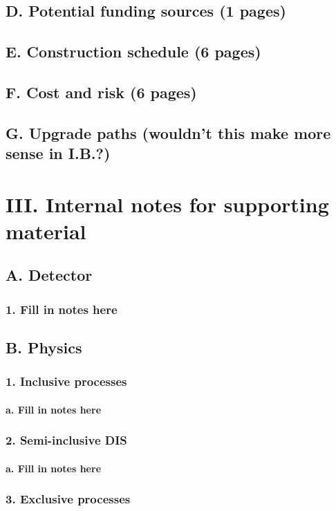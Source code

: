 \documentclass{report}
\begin{document}
\section{D. Potential funding sources (1 pages)}
\section{E. Construction schedule (6 pages)}
\section{F. Cost and risk (6 pages)}
\section{G. Upgrade paths (wouldn’t this make more sense in I.B.?)}
%
\chapter{III. Internal notes for supporting material}
%
\section{A. Detector}
\subsection{1. Fill in notes here}
%
\section{B. Physics}
\subsection{1. Inclusive processes}
\subsubsection{a. Fill in notes here}
\subsection{2. Semi-inclusive DIS}
\subsubsection{a. Fill in notes here}
\subsection{3. Exclusive processes} 
\end{document}
